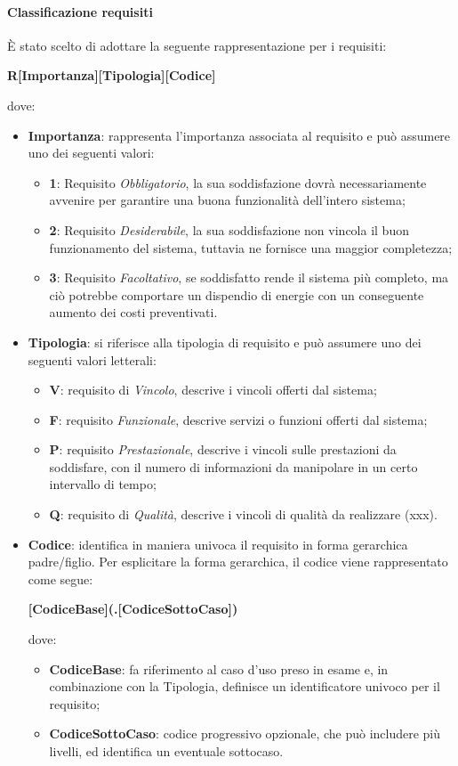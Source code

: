 \paragraph{Classificazione requisiti}
È stato scelto di adottare la seguente rappresentazione per i requisiti:

\begin{center}
\textbf{R[Importanza][Tipologia][Codice]}
\end{center}
dove:
\begin{itemize}
\item \textbf{Importanza}: rappresenta l’importanza associata al requisito e può assumere uno dei seguenti valori:
\begin{itemize}
	\item \textbf{1}: Requisito \textit{Obbligatorio}, la sua soddisfazione dovrà necessariamente avvenire per garantire una buona funzionalità dell’intero sistema;
	\item \textbf{2}: Requisito \textit{Desiderabile}, la sua soddisfazione non vincola il buon funzionamento del sistema, tuttavia ne fornisce una maggior completezza;
	\item \textbf{3}: Requisito \textit{Facoltativo}, se soddisfatto rende il sistema più completo, ma ciò potrebbe comportare un dispendio di energie con un conseguente aumento dei costi preventivati.
\end{itemize}
\item \textbf{Tipologia}: si riferisce alla tipologia di requisito e può assumere uno dei seguenti valori letterali:
\begin{itemize}
	\item \textbf{V}: requisito di \textit{Vincolo}, descrive i vincoli offerti dal sistema;
	\item \textbf{F}: requisito \textit{Funzionale}, descrive servizi o funzioni offerti dal sistema;
	\item \textbf{P}: requisito \textit{Prestazionale}, descrive i vincoli sulle prestazioni da soddisfare, con il numero di informazioni da manipolare in un certo intervallo di tempo;
	\item \textbf{Q}: requisito di \textit{Qualità}, descrive i vincoli di qualità da realizzare (xxx).
\end{itemize}
\item \textbf{Codice}: identifica in maniera univoca il requisito in forma gerarchica padre/figlio.
Per esplicitare la forma gerarchica, il codice viene rappresentato come segue:
\begin{center}
\textbf{[CodiceBase](.[CodiceSottoCaso])}
\end{center}
dove: 
\begin{itemize}
	\item \textbf{CodiceBase}: fa riferimento al caso d’uso preso in esame e, in combinazione con la Tipologia, definisce un identificatore univoco per il requisito;
	\item \textbf{CodiceSottoCaso}: codice progressivo opzionale, che può includere più livelli, ed identifica un eventuale sottocaso.
\end{itemize}
\end{itemize}

